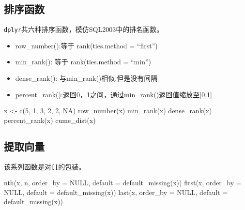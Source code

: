\documentclass[
]{book}
\newenvironment{Shaded}{\begin{snugshade}}{\end{snugshade}}
\newcommand{\AttributeTok}[1]{\textcolor[rgb]{0.77,0.63,0.00}{#1}}
\newcommand{\ConstantTok}[1]{\textcolor[rgb]{0.00,0.00,0.00}{#1}}
\newcommand{\DecValTok}[1]{\textcolor[rgb]{0.00,0.00,0.81}{#1}}
\newcommand{\FunctionTok}[1]{\textcolor[rgb]{0.00,0.00,0.00}{#1}}
\newcommand{\NormalTok}[1]{#1}
\newcommand{\OtherTok}[1]{\textcolor[rgb]{0.56,0.35,0.01}{#1}}
\providecommand{\tightlist}{%
  \setlength{\itemsep}{0pt}\setlength{\parskip}{0pt}}
\begin{document}
\hypertarget{ux6392ux5e8fux51fdux6570-1}{%
\subsection{排序函数}\label{ux6392ux5e8fux51fdux6570-1}}

\texttt{dplyr}共六种排序函数，模仿SQL2003中的排名函数。

\begin{itemize}
\tightlist
\item
  row\_number():等于 rank(ties.method = ``first'')
\item
  min\_rank(): 等于 rank(ties.method = ``min'')
\item
  dense\_rank(): 与min\_rank()相似,但是没有间隔
\item
  percent\_rank():返回0，1之间，通过min\_rank()返回值缩放至{[}0,1{]}
\end{itemize}

\begin{Shaded}
\begin{Highlighting}[]
\NormalTok{x }\OtherTok{\textless{}{-}} \FunctionTok{c}\NormalTok{(}\DecValTok{5}\NormalTok{, }\DecValTok{1}\NormalTok{, }\DecValTok{3}\NormalTok{, }\DecValTok{2}\NormalTok{, }\DecValTok{2}\NormalTok{, }\ConstantTok{NA}\NormalTok{)}
\FunctionTok{row\_number}\NormalTok{(x)}
\FunctionTok{min\_rank}\NormalTok{(x)}
\FunctionTok{dense\_rank}\NormalTok{(x)}
\FunctionTok{percent\_rank}\NormalTok{(x)}
\FunctionTok{cume\_dist}\NormalTok{(x)}
\end{Highlighting}
\end{Shaded}

\hypertarget{ux63d0ux53d6ux5411ux91cf}{%
\subsection{提取向量}\label{ux63d0ux53d6ux5411ux91cf}}

该系列函数是对\texttt{{[}{[}}的包装。

\begin{Shaded}
\begin{Highlighting}[]
\FunctionTok{nth}\NormalTok{(x, n, }\AttributeTok{order\_by =} \ConstantTok{NULL}\NormalTok{, }\AttributeTok{default =} \FunctionTok{default\_missing}\NormalTok{(x))}
\FunctionTok{first}\NormalTok{(x, }\AttributeTok{order\_by =} \ConstantTok{NULL}\NormalTok{, }\AttributeTok{default =} \FunctionTok{default\_missing}\NormalTok{(x))}
\FunctionTok{last}\NormalTok{(x, }\AttributeTok{order\_by =} \ConstantTok{NULL}\NormalTok{, }\AttributeTok{default =} \FunctionTok{default\_missing}\NormalTok{(x))}
\end{Highlighting}
\end{Shaded}
\end{document}
